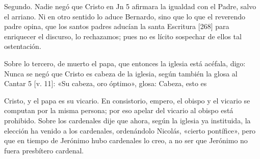 Segundo. Nadie negó que Cristo en Jn 5 afirmara la igualdad con el Padre, salvo el arriano. Ni en otro sentido lo aduce Bernardo, sino que lo que el reverendo padre opina, que los santos padres aducían la santa Escritura [268] para enriquecer el discurso, lo rechazamos; pues no es lícito sospechar de ellos tal ostentación.

Sobre lo tercero, de muerto el papa, que entonces la iglesia está acéfala, digo: Nunca se negó que Cristo es cabeza de la iglesia, según también la glosa al Cantar 5 [v. 11]: «Su cabeza, oro óptimo», glosa: Cabeza, esto es

Cristo, y el papa es su vicario. En consistorio, empero, el obispo y el vicario se computan por la misma persona; por eso apelar del vicario al obispo está prohibido. Sobre los cardenales dije que ahora, según la iglesia ya instituida, la elección ha venido a los cardenales, ordenándolo Nicolás, «cierto pontífice», pero que en tiempo de Jerónimo hubo cardenales lo creo, a no ser que Jerónimo no fuera presbítero cardenal.

